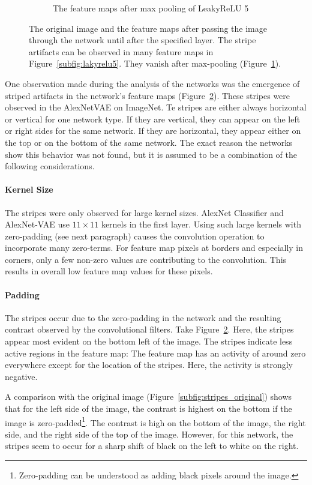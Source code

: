 \begin{figure}
\begin{subfigure}{0.3\textwidth}
        \caption{The feature maps after max pooling of LeakyReLU 5}
        \label{subfig:maxpool}
    \end{subfigure}
    \caption[Feature map stripes]{The original image and the feature maps after passing the image through the network until after the specified layer. The stripe artifacts can be observed in many feature maps in Figure~\ref{subfig:lakyrelu5}. They vanish after max-pooling (Figure~\ref{subfig:maxpool}).}
    \label{fig:stripes}
\end{figure}


One observation made during the analysis of the networks was the emergence of striped artifacts in the network's feature maps (Figure~\ref{fig:stripes}).
These stripes were observed in the AlexNetVAE on ImageNet.
Te stripes are either always horizontal or vertical for one network type.
If they are vertical, they can appear on the left or right sides for the same network.
If they are horizontal, they appear either on the top or on the bottom of the same network.
The exact reason the networks show this behavior was not found, but it is assumed to be a combination of the following considerations.

\paragraph{Kernel Size}
The stripes were only observed for large kernel sizes.
AlexNet Classifier and AlexNet-\ac{VAE} use $11\times 11$ kernels in the first layer.
Using such large kernels with zero-padding (see next paragraph) causes the convolution operation to incorporate many zero-terms.
For feature map pixels at borders and especially in corners, only a few non-zero values are contributing to the convolution.
This results in overall low feature map values for these pixels.

\paragraph{Padding}
The stripes occur due to the zero-padding in the network and the resulting contrast observed by the convolutional filters.
Take Figure~\ref{fig:stripes}.
Here, the stripes appear most evident on the bottom left of the image.
The stripes indicate less active regions in the feature map: The feature map has an activity of around zero everywhere except for the location of the stripes.
Here, the activity is strongly negative.

A comparison with the original image (Figure~\ref{subfig:stripes_original}) shows that for the left side of the image, the contrast is highest on the bottom if the image is zero-padded\footnote{Zero-padding can be understood as adding black pixels around the image.}.
The contrast is high on the bottom of the image, the right side, and the right side of the top of the image.
However, for this network, the stripes seem to occur for a sharp shift of black on the left to white on the right.

